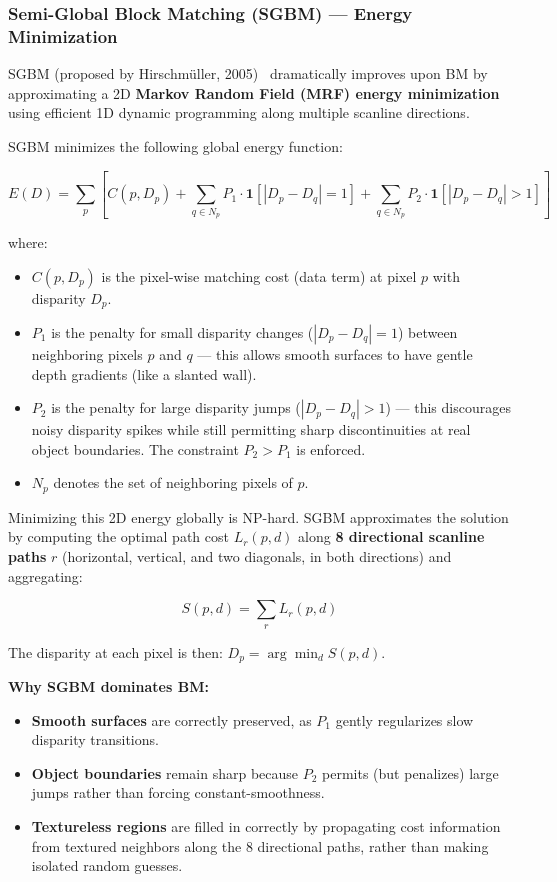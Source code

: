 \documentclass[a4paper,12pt]{article}
\begin{document}
\subsubsection{Semi-Global Block Matching (SGBM) --- Energy Minimization}

SGBM (proposed by Hirschm\"uller, 2005)~\cite{hirschmuller2005accurate} dramatically improves upon BM by approximating a 2D \textbf{Markov Random Field (MRF) energy minimization} using efficient 1D dynamic programming along multiple scanline directions.

SGBM minimizes the following global energy function:

\begin{equation}
    E(D) = \sum_{p} \left[ C(p, D_p) + \sum_{q \in N_p} P_1 \cdot \mathbf{1}[|D_p - D_q| = 1] + \sum_{q \in N_p} P_2 \cdot \mathbf{1}[|D_p - D_q| > 1] \right]
\end{equation}

where:
\begin{itemize}
    \item $C(p, D_p)$ is the pixel-wise matching cost (data term) at pixel $p$ with disparity $D_p$.
    \item $P_1$ is the penalty for small disparity changes ($|D_p - D_q| = 1$) between neighboring pixels $p$ and $q$ --- this allows smooth surfaces to have gentle depth gradients (like a slanted wall).
    \item $P_2$ is the penalty for large disparity jumps ($|D_p - D_q| > 1$) --- this discourages noisy disparity spikes while still permitting sharp discontinuities at real object boundaries. The constraint $P_2 > P_1$ is enforced.
    \item $N_p$ denotes the set of neighboring pixels of $p$.
\end{itemize}

Minimizing this 2D energy globally is NP-hard. SGBM approximates the solution by computing the optimal path cost $L_r(p, d)$ along \textbf{8 directional scanline paths} $r$ (horizontal, vertical, and two diagonals, in both directions) and aggregating:

\begin{equation}
    S(p, d) = \sum_{r} L_r(p, d)
\end{equation}

The disparity at each pixel is then: $D_p = \arg\min_d S(p, d)$.

\textbf{Why SGBM dominates BM:}
\begin{itemize}
    \item \textbf{Smooth surfaces} are correctly preserved, as $P_1$ gently regularizes slow disparity transitions.
    \item \textbf{Object boundaries} remain sharp because $P_2$ permits (but penalizes) large jumps rather than forcing constant-smoothness.
    \item \textbf{Textureless regions} are filled in correctly by propagating cost information from textured neighbors along the 8 directional paths, rather than making isolated random guesses.
\end{itemize}
\end{document}

